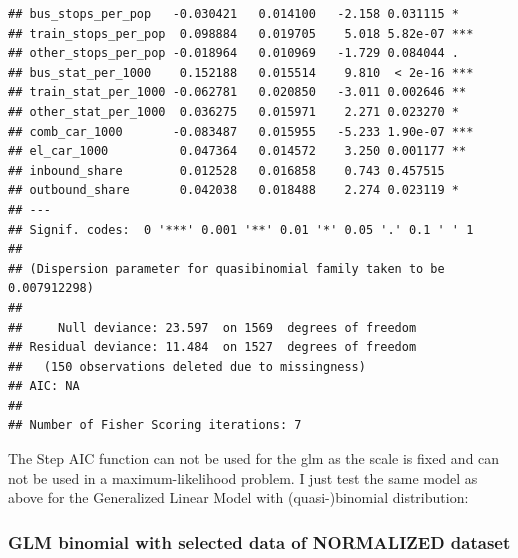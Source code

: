 \documentclass[
]{article}
\begin{document}
\begin{verbatim}
## bus_stops_per_pop   -0.030421   0.014100   -2.158 0.031115 *  
## train_stops_per_pop  0.098884   0.019705    5.018 5.82e-07 ***
## other_stops_per_pop -0.018964   0.010969   -1.729 0.084044 .  
## bus_stat_per_1000    0.152188   0.015514    9.810  < 2e-16 ***
## train_stat_per_1000 -0.062781   0.020850   -3.011 0.002646 ** 
## other_stat_per_1000  0.036275   0.015971    2.271 0.023270 *  
## comb_car_1000       -0.083487   0.015955   -5.233 1.90e-07 ***
## el_car_1000          0.047364   0.014572    3.250 0.001177 ** 
## inbound_share        0.012528   0.016858    0.743 0.457515    
## outbound_share       0.042038   0.018488    2.274 0.023119 *  
## ---
## Signif. codes:  0 '***' 0.001 '**' 0.01 '*' 0.05 '.' 0.1 ' ' 1
## 
## (Dispersion parameter for quasibinomial family taken to be 0.007912298)
## 
##     Null deviance: 23.597  on 1569  degrees of freedom
## Residual deviance: 11.484  on 1527  degrees of freedom
##   (150 observations deleted due to missingness)
## AIC: NA
## 
## Number of Fisher Scoring iterations: 7
\end{verbatim}

The Step AIC function can not be used for the glm as the scale is fixed
and can not be used in a maximum-likelihood problem. I just test the
same model as above for the Generalized Linear Model with
(quasi-)binomial distribution:

\hypertarget{glm-binomial-with-selected-data-of-normalized-dataset}{%
\subsubsection{GLM binomial with selected data of NORMALIZED
dataset}\label{glm-binomial-with-selected-data-of-normalized-dataset}}
\end{document}
